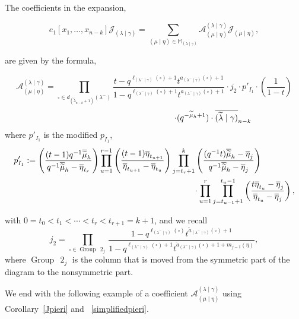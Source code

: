 \documentclass[ALCO]{cedram}
\newcommand{\JJ}{\mathcal{J}_{(\lambda \mid \gamma)}}
\newcommand{\MMM}{\mathbb{M}_{\lambdagamma}}
\newcommand{\CC}{\mathcal{A}^\lambdagamma_\mueta}
\newcommand{\nudom}{{( \lambda \mid \gamma )}}
\newcommand{\lambdagamma}{{\nudom}}
\newcommand{\mueta}{{(\mu \mid \eta)}}
\newcommand{\mutilde}{{\widetilde{\mu}}}
\newcommand{\lambdatilde}{{\widetilde{\lambda}}}
\newcommand{\lambdatildegamma}{{(\lambdatilde \mid \gamma)}}
\newcommand{\lambdamingamma}{(\lambda^- \mid \gamma)}
\newcommand{\hIone}{h}
\newcommand{\leg}[1]{{\ell_{#1}(\square)}}
\newcommand{\armone}[1]{{\widetilde{a}_{#1}(\square)}}
\newcommand{\group}[1]{\operatorname{Group}\,\operatorname{#1}}
\newcommand{\jtwo}{j_2}
\begin{document}
\begin{thm} The coefficients in the expansion,

\[ e_1[x_1,\dotsc,x_{n-k}]\JJ = \sum_{\mueta \in \MMM}  \CC \mathcal{J}_{\mueta}, \]


are given by the formula,

\begin{equation}\label{simplifiedpieri} \CC = \prod_{ \square \in d_{(\lambdatilde_{n-k}+1)}(\lambda^-)}\frac{t-q^{\ell_{\lambdamingamma}(\square)+1}t^{a_{\lambdamingamma}(\square)+1}}{1-q^{\ell_{\lambdamingamma}(\square)+1}t^{a_{\lambdamingamma}(\square)+1}} \cdot \jtwo \cdot p'_{I_1} \cdot \left(\frac{1}{1-t}\right) \end{equation}
\[ \hspace*{5cm}\cdot (q^{-\mutilde_h+1}) \cdot \overline{\lambdatildegamma}_{n-k}\]
where $p'_{I_1}$ is the modified $p_{I_1}$,
\begin{align*} p'_{I_1} := \left(\frac{(t-1)q^{-1} \overline{\mutilde}_{\hIone}}{q^{-1} \overline{\mutilde}_{\hIone}-\overline{\eta}_{t_r}}\right) & \prod_{u=1}^{r-1} \left(\frac{(t-1) \overline{\eta}_{t_{u+1}}}{ \overline{\eta}_{t_{u+1}}-\overline{\eta}_{t_{u}}} \right)  \prod_{j=t_r+1}^{k} \left( \frac{(q^{-1}t) \overline{\mutilde}_{\hIone} -  \overline{\eta}_j}{q^{-1} \overline{\mutilde}_{\hIone} -  \overline{\eta}_j}\right)\\ &\hspace*{4cm}\cdot \prod_{u=1}^{r} \prod_{j=t_{u-1}+1}^{t_{u}-1} \left( \frac{t\overline{\eta}_{t_u} -  \overline{\eta}_j}{ \overline{\eta}_{t_{u}} -  \overline{\eta}_j} \right),\end{align*}

with $0 = t_0 < t_1 < \dotsm < t_r < t_{r+1}  = k+1$, and we recall
\[\jtwo  = \prod\limits_{\square \in \group{2}_j}\frac{1-q^{\leg{\lambdamingamma}}t^{\armone{\lambdamingamma}+1} }{ 1-q^{\leg{\lambdamingamma}+1}t^{\armone{\lambdamingamma}+1+m_{j-1}(\eta)}},\]
where $\group{2}_j$ is the column that is moved from the symmetric part of the diagram to the nonsymmetric part.
\end{thm}


We end with the following example of a coefficient $\CC$ using Corollary~\ref{Jpieri} and ~\eqref{simplifiedpieri}.
\end{document}
